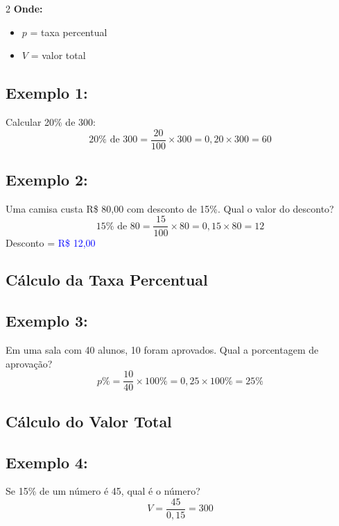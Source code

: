 \documentclass[11pt]{article}
\begin{document}
\begin{multicols}{2}
\textbf{Onde:}
\begin{itemize}
\item $p$ = taxa percentual
\item $V$ = valor total
\end{itemize}

\subsection*{Exemplo 1:}
Calcular 20\% de 300:
\[
20\% \text{ de } 300 = \frac{20}{100} \times 300 = 0,20 \times 300 = 60
\]

\subsection*{Exemplo 2:}
Uma camisa custa R\$ 80,00 com desconto de 15\%. Qual o valor do desconto?
\[
15\% \text{ de } 80 = \frac{15}{100} \times 80 = 0,15 \times 80 = 12
\]
Desconto = \textcolor{blue}{R\$ 12,00}

\subsection*{Cálculo da Taxa Percentual}


\subsection*{Exemplo 3:}
Em uma sala com 40 alunos, 10 foram aprovados. Qual a porcentagem de aprovação?
\[
p\% = \frac{10}{40} \times 100\% = 0,25 \times 100\% = 25\%
\]

\subsection*{Cálculo do Valor Total}


\subsection*{Exemplo 4:}
Se 15\% de um número é 45, qual é o número?
\[
V = \frac{45}{0,15} = 300
\]


\end{multicols}
\end{document}
